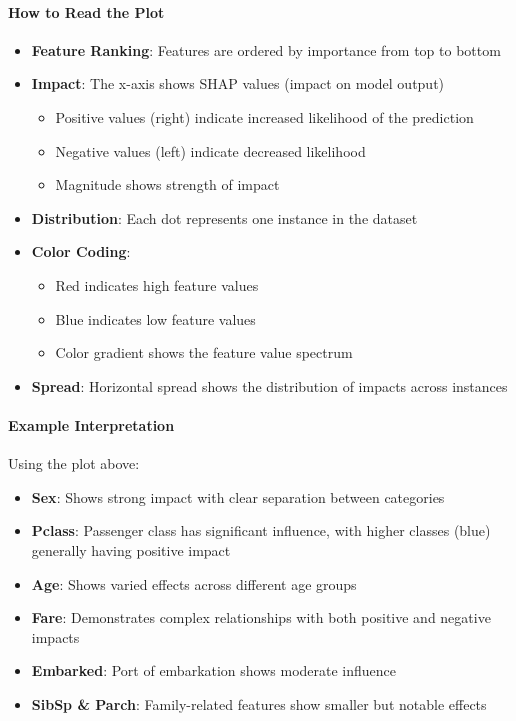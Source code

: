 \documentclass{article}
\begin{document}
\paragraph{How to Read the Plot}
\begin{itemize}
    \item \textbf{Feature Ranking}: Features are ordered by importance from top to bottom
    \item \textbf{Impact}: The x-axis shows SHAP values (impact on model output)
        \begin{itemize}
            \item Positive values (right) indicate increased likelihood of the prediction
            \item Negative values (left) indicate decreased likelihood
            \item Magnitude shows strength of impact
        \end{itemize}
    \item \textbf{Distribution}: Each dot represents one instance in the dataset
    \item \textbf{Color Coding}:
        \begin{itemize}
            \item Red indicates high feature values
            \item Blue indicates low feature values
            \item Color gradient shows the feature value spectrum
        \end{itemize}
    \item \textbf{Spread}: Horizontal spread shows the distribution of impacts across instances
\end{itemize}

\paragraph{Example Interpretation}
Using the plot above:
\begin{itemize}
    \item \textbf{Sex}: Shows strong impact with clear separation between categories
    \item \textbf{Pclass}: Passenger class has significant influence, with higher classes (blue) generally having positive impact
    \item \textbf{Age}: Shows varied effects across different age groups
    \item \textbf{Fare}: Demonstrates complex relationships with both positive and negative impacts
    \item \textbf{Embarked}: Port of embarkation shows moderate influence
    \item \textbf{SibSp \& Parch}: Family-related features show smaller but notable effects
\end{itemize}
\end{document}
